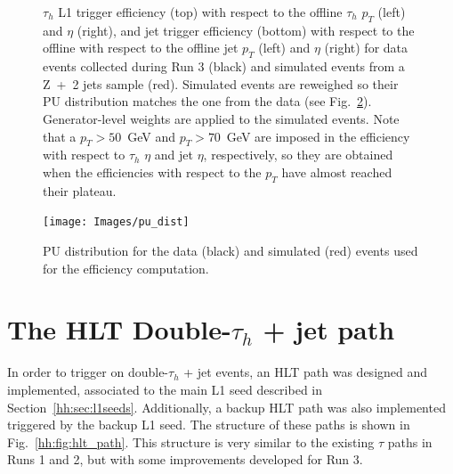 \documentclass[../main.tex]{subfiles}
\begin{document}
\begin{figure}[h!]
\begin{center}
\end{center}
\caption{$\tau_h$ L1 trigger efficiency (top) with respect to the offline $\tau_h$ $p_T$ (left) and $\eta$ (right), and jet trigger efficiency (bottom) with respect to the offline with respect to the offline jet $p_T$ (left) and $\eta$ (right) for data events collected during Run 3 (black) and simulated events from a Z~+~2 jets sample (red). Simulated events are reweighed so their PU distribution matches the one from the data (see Fig.~\ref{hh:fig:trig_pu_dist}). Generator-level weights are applied to the simulated events. Note that a $p_T>50$~GeV and $p_T>70$~GeV are imposed in the efficiency with respect to $\tau_h$ $\eta$ and jet $\eta$, respectively, so they are obtained when the efficiencies with respect to the $p_T$ have almost reached their plateau. }
\label{hh:fig:l1_eff_datamc}
\end{figure}

\begin{figure}[h!]
\begin{center}
\texttt{[image: Images/pu\_dist]}
\end{center}
\caption{PU distribution for the data (black) and simulated (red) events used for the efficiency computation.}
\label{hh:fig:trig_pu_dist}
\end{figure}



\section{The HLT Double-$\tau_h$ + jet path}
\label{hh:sec:hlt_doubletaujet}

In order to trigger on double-$\tau_h$ + jet events, an HLT path was designed and implemented, associated to the main L1 seed described in Section~\ref{hh:sec:l1seeds}. Additionally, a backup HLT path was also implemented triggered by the backup L1 seed. The structure of these paths is shown in Fig.~\ref{hh:fig:hlt_path}. This structure is very similar to the existing $\tau$ paths in Runs 1 and 2, but with some improvements developed for Run 3.
\end{document}
